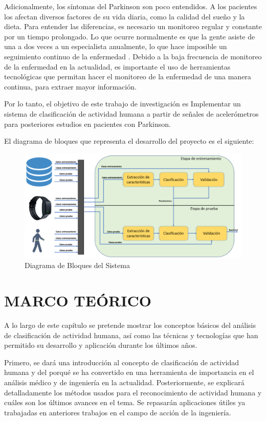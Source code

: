 \documentclass[11pt]{report}
\begin{document}
\par
\medskip
\noindent
Adicionalmente, los síntomas del Parkinson son poco entendidos. A los pacientes los afectan diversos factores de su vida diaria, como la calidad del sueño y la dieta. Para entender las diferencias, es necesario un monitoreo regular y constante por un tiempo prolongado. Lo que ocurre normalmente es que la gente asiste de una a dos veces a un especialista anualmente, lo que hace imposible un seguimiento continuo de la enfermedad \cite{elcomercio}. Debido a la baja frecuencia de monitoreo de la enfermedad en la actualidad, es importante el uso de herramientas tecnológicas que permitan hacer el monitoreo de la enfermedad de una manera continua, para extraer mayor información.
\par
\medskip
\noindent
Por lo tanto, el objetivo de este trabajo de investigación es Implementar un sistema de clasificación de actividad humana a partir de señales de acelerómetros para posteriores estudios en pacientes con Parkinson.
\par
\medskip
\noindent
El diagrama de bloques que representa el desarrollo del proyecto es el siguiente:
\begin{figure}[h]
  \centering
    \includegraphics[width=1\textwidth]{diagrama}
   \caption{Diagrama de Bloques del Sistema}
\end{figure}

\chapter{MARCO TEÓRICO}
A lo largo de este capítulo se pretende mostrar los conceptos básicos del análisis de clasificación de actividad humana,
así como las técnicas y tecnologías que han permitido su desarrollo y aplicación durante los últimos años.
\par
\medskip
\noindent
Primero, se dará una introducción al concepto de clasificación de actividad humana y del porqué se ha convertido en una herramienta
de importancia en el análisis médico y de ingeniería en la actualidad. Posteriormente, se explicará detalladamente los métodos usados para el reconocimiento de actividad humana y cuáles son los últimos avances en el tema. Se repasarán aplicaciones útiles ya trabajadas en anteriores trabajos en el campo de acción de la ingeniería.
\end{document}
